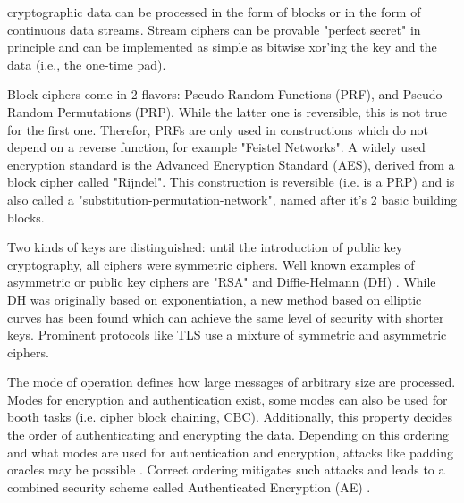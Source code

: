 \documentclass[a4paper,11pt,oneside]{memoir}
\begin{document}
cryptographic data can be processed in the form of blocks or in the form of continuous
data streams. Stream ciphers can be provable "perfect secret" in principle
and can be implemented as simple as bitwise xor'ing the key and the data (i.e., the one-time pad). 

Block ciphers come in 2 flavors: Pseudo Random Functions (PRF), and Pseudo Random Permutations (PRP). While the latter one is reversible,
this is not true for the first one. Therefor, PRFs are only used in constructions which do not depend on a reverse function, for
example "Feistel Networks". A widely used encryption standard is the Advanced Encryption Standard (AES), derived from a block cipher
called "Rijndel".
This construction is reversible (i.e. is a PRP) and is also called a "substitution-permutation-network", named after it's 2 basic building blocks.
 
 Two kinds of keys are distinguished: until the introduction of public key cryptography, all ciphers were symmetric ciphers.
 Well known examples
 of asymmetric or public key ciphers are "RSA" \cite{Rivest:1978:MOD:359340.359342} and Diffie-Helmann (DH) \cite{1055638}. 
 While DH was originally based on exponentiation,
 a new method based on elliptic curves has been found which can achieve the same level of security with shorter keys.
 Prominent protocols like TLS \cite{rfc2246} use a mixture of symmetric and asymmetric ciphers.
 
 
 The mode of operation defines how large messages of arbitrary size are processed.
 Modes for encryption and authentication exist, some modes can also be used for booth tasks (i.e. cipher block chaining, CBC). Additionally, this property 
 decides the order of authenticating and encrypting the data. Depending on this ordering and
 what modes are used for authentication and encryption, attacks like padding oracles may be possible \cite{Vaudenay02securityflaws}. Correct ordering
 mitigates such attacks \cite{cryptoeprint} and leads to a combined security scheme called Authenticated Encryption (AE) \cite{ocb}.
 
\end{document}
